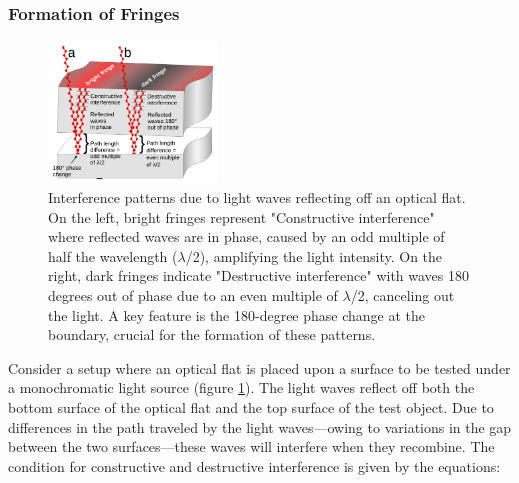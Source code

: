 \documentclass[../main.tex]{subfiles}
\begin{document}
\subsubsection{Formation of Fringes}
\vspace{-15pt}
\begin{minipage}{\textwidth}
\begin{figure}%
    \vspace{\dimexpr0.3\baselineskip-\topskip}%
    \vspace{-2cm}
    \noindent
    \includegraphics[width=0.4\textwidth]{Images/Introduction/Optical_flat_interference}
    \vspace{-8pt}
    \caption{Interference patterns due to light waves reflecting off an optical flat. On the left, bright fringes represent "Constructive interference" where reflected waves are in phase, caused by an odd multiple of half the wavelength (\(\lambda\)/2), amplifying the light intensity. On the right, dark fringes indicate "Destructive interference" with waves 180 degrees out of phase due to an even multiple of \(\lambda\)/2, canceling out the light. A key feature is the 180-degree phase change at the boundary, crucial for the formation of these patterns. \cite{enwiki:1212101911}}
    \label{fig:interference_fringes}
\end{figure}
Consider a setup where an optical flat is placed upon a surface to be tested under a monochromatic light source (figure \ref{fig:interference_fringes}). The light waves reflect off both the bottom surface of the optical flat and the top surface of the test object. Due to differences in the path traveled by the light waves—owing to variations in the gap between the two surfaces—these waves will interfere when they recombine. The condition for constructive and destructive interference is given by the equations:
\end{minipage}
\end{document}
